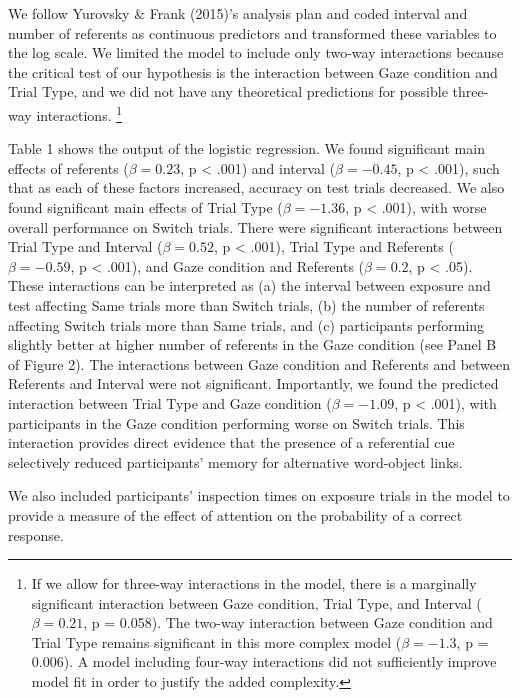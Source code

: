 \documentclass[authoryear, review]{elsarticle}
\begin{document}
We follow Yurovsky \& Frank (2015)'s analysis plan and coded interval
and number of referents as continuous predictors and transformed these
variables to the log scale. We limited the model to include only two-way
interactions because the critical test of our hypothesis is the
interaction between Gaze condition and Trial Type, and we did not have
any theoretical predictions for possible three-way interactions.
\footnote{If we allow for three-way interactions in the model, there is a marginally significant interaction between Gaze condition, Trial Type, and Interval ($\beta = 0.21$, p = 0.058). The two-way interaction between Gaze condition and Trial Type remains significant in this more complex model ($\beta = -1.3$, p = 0.006). A model including four-way interactions did not sufficiently improve model fit in order to justify the added complexity.}

Table 1 shows the output of the logistic regression. We found
significant main effects of referents (\(\beta = 0.23\), p \textless{}
.001) and interval (\(\beta = -0.45\), p \textless{} .001), such that as
each of these factors increased, accuracy on test trials decreased. We
also found significant main effects of Trial Type (\(\beta = -1.36\), p
\textless{} .001), with worse overall performance on Switch trials.
There were significant interactions between Trial Type and Interval
(\(\beta = 0.52\), p \textless{} .001), Trial Type and Referents
(\(\beta = -0.59\), p \textless{} .001), and Gaze condition and
Referents (\(\beta = 0.2\), p \textless{} .05). These interactions can
be interpreted as (a) the interval between exposure and test affecting
Same trials more than Switch trials, (b) the number of referents
affecting Switch trials more than Same trials, and (c) participants
performing slightly better at higher number of referents in the Gaze
condition (see Panel B of Figure 2). The interactions between Gaze
condition and Referents and between Referents and Interval were not
significant. Importantly, we found the predicted interaction between
Trial Type and Gaze condition (\(\beta = -1.09\), p \textless{} .001),
with participants in the Gaze condition performing worse on Switch
trials. This interaction provides direct evidence that the presence of a
referential cue selectively reduced participants' memory for alternative
word-object links.

We also included participants' inspection times on exposure trials in
the model to provide a measure of the effect of attention on the
probability of a correct response.
\end{document}
